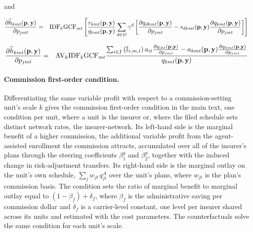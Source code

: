 \documentclass[12pt]{article}
\begin{document}
\noindent and

\begin{eqnarray*}
		\frac{\partial \widehat{h}_{kmt}({\bf p},{\bf y})}{\partial p_{jmt}} &=& \mathrm{IDF}_k\mathrm{GCF}_{mt} \left[\frac{r_{kmt}({\bf p},{\bf y})}{q_{kmt}({\bf p},{\bf y})} \sum_{d \in D} \gamma^d \left[\frac{\partial q_{dkmt}({\bf p},{\bf y})}{\partial p_{jmt}} - s_{dkmt}({\bf p},{\bf y}) \frac{\partial q_{kmt}({\bf p},{\bf y})}{\partial p_{jmt}} \right] \right]
	\end{eqnarray*}
	
	\vspace{-0.3in}
	
	\begin{eqnarray*}
		\frac{\partial \widetilde{h}_{kmt}({\bf p},{\bf y})}{\partial p_{jmt}} &=& \mathrm{AV}_k \mathrm{IDF}_k\mathrm{GCF}_{mt} \frac{\sum_{i \in I} \left(\mathbb{I}_{i,m,t} \right) a_{it} \frac{ \partial q_{ikt}({\bf p},{\bf y})}{\partial p_{jmt}} - a_{kmt}({\bf p},{\bf y}) \frac{\partial q_{kmt}({\bf p},{\bf y})}{\partial p_{jmt}}}{q_{kmt}({\bf p},{\bf y})}
	\end{eqnarray*}

\paragraph{Commission first-order condition.} Differentiating the same variable profit with respect to a commission-setting unit's scale $k$ gives the commission first-order condition in the main text, one condition per unit, where a unit is the insurer or, where the filed schedule sets distinct network rates, the insurer-network. Its left-hand side is the marginal benefit of a higher commission, the additional variable profit from the agent-assisted enrollment the commission attracts, accumulated over all of the insurer's plans through the steering coefficients $\beta^{y}_{1}$ and $\beta^{y}_{2}$, together with the induced change in risk-adjustment transfers. Its right-hand side is the marginal outlay on the unit's own schedule, $\sum_{j} w_{jt}\, q^{A}_{jt}$ over the unit's plans, where $w_{jt}$ is the plan's commission basis. The condition sets the ratio of marginal benefit to marginal outlay equal to $(1 - \beta_f) + \delta_f$, where $\beta_f$ is the administrative saving per commission dollar and $\delta_f$ is a carrier-level constant, one level per insurer shared across its units and estimated with the cost parameters. The counterfactuals solve the same condition for each unit's scale.
\end{document}

